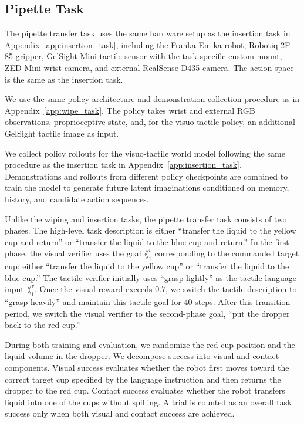 \subsection{Pipette Task}
\label{app:pipette_task}
 The pipette transfer task uses the same hardware setup as the insertion task in Appendix~\ref{app:insertion_task}, including the Franka Emika robot, Robotiq 2F-85 gripper, GelSight Mini tactile sensor with the task-specific custom mount, ZED Mini wrist camera, and external RealSense D435 camera. The action space is the same as the insertion task.

 We use the same policy architecture and demonstration collection procedure as in Appendix~\ref{app:wipe_task}. The policy takes wrist and external RGB observations, proprioceptive state, and, for the visuo-tactile policy, an additional GelSight tactile image as input. 

 We collect policy rollouts for the visuo-tactile world model following the same procedure as the insertion task in Appendix~\ref{app:insertion_task}. Demonstrations and rollouts from different policy checkpoints are combined to train the model to generate future latent imaginations conditioned on memory, history, and candidate action sequences.

 Unlike the wiping and insertion tasks, the pipette transfer task consists of two phases. The high-level task description is either ``transfer the liquid to the yellow cup and return'' or ``transfer the liquid to the blue cup and return.'' In the first phase, the visual verifier uses the goal $\lang_1^v$ corresponding to the commanded target cup: either ``transfer the liquid to the yellow cup'' or ``transfer the liquid to the blue cup.'' The tactile verifier initially uses ``grasp lightly'' as the tactile language input $\lang_1^\tau$. Once the visual reward exceeds $0.7$, we switch the tactile description to ``grasp heavily'' and maintain this tactile goal for 40 steps. After this transition period, we switch the visual verifier to the second-phase goal, ``put the dropper back to the red cup.''

 During both training and evaluation, we randomize the red cup position and the liquid volume in the dropper. We decompose success into visual and contact components. Visual success evaluates whether the robot first moves toward the correct target cup specified by the language instruction and then returns the dropper to the red cup. Contact success evaluates whether the robot transfers liquid into one of the cups without spilling. A trial is counted as an overall task success only when both visual and contact success are achieved.

